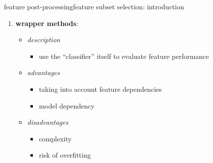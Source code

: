 		\begin{frame}{feature post-processing}{feature subset selection: introduction}
			\begin{enumerate}
				\item	\textbf{wrapper methods}:
                    \begin{itemize}
                        \item \textit{description}
                            \begin{itemize}
                                \item  use the ``classifier'' itself to evaluate feature performance
                            \end{itemize}
                         \item<2-> \textit{advantages}
                            \begin{itemize}
                                \item   taking into account feature dependencies
                                \item   model dependency
                            \end{itemize}
                         \item<3-> \textit{disadvantages}
                            \begin{itemize}
                                \item   complexity
                                \item   risk of overfitting
                            \end{itemize}
                  \end{itemize}
				

\end{enumerate}
\end{frame}
